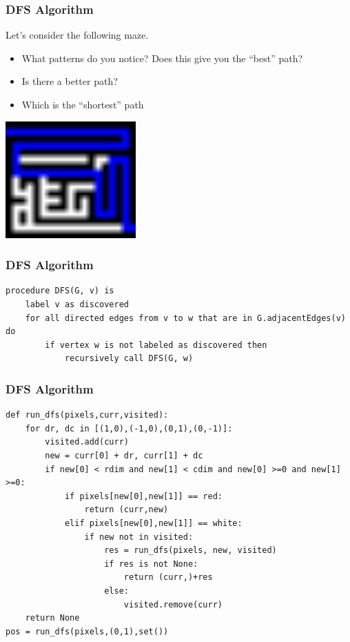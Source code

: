 \documentclass{beamer}
\begin{document}
        \begin{frame}
            \frametitle{DFS Algorithm}
            Let's consider the following maze.
            \begin{itemize}
                \item What patterns do you notice? Does this give you the ``best'' path? 
                \item Is there a better path?
                \item Which is the ``shortest'' path


            \end{itemize}
        
            \includegraphics[width=5cm,scale=2]{../dfs_out.png}
        
            
            \end{frame}
            \begin{frame}[fragile]
                \frametitle{DFS Algorithm}
\begin{lstlisting}
procedure DFS(G, v) is
    label v as discovered
    for all directed edges from v to w that are in G.adjacentEdges(v) do
        if vertex w is not labeled as discovered then
            recursively call DFS(G, w)
\end{lstlisting}

            \end{frame}

            \begin{frame}[fragile]
                \frametitle{DFS Algorithm}
\begin{lstlisting}
def run_dfs(pixels,curr,visited):
    for dr, dc in [(1,0),(-1,0),(0,1),(0,-1)]:
        visited.add(curr)
        new = curr[0] + dr, curr[1] + dc
        if new[0] < rdim and new[1] < cdim and new[0] >=0 and new[1] >=0:
            if pixels[new[0],new[1]] == red:
                return (curr,new)
            elif pixels[new[0],new[1]] == white:
                if new not in visited:
                    res = run_dfs(pixels, new, visited)
                    if res is not None:
                        return (curr,)+res
                    else:
                        visited.remove(curr)
    return None
pos = run_dfs(pixels,(0,1),set())\end{lstlisting}

            \end{frame}
\end{document}
